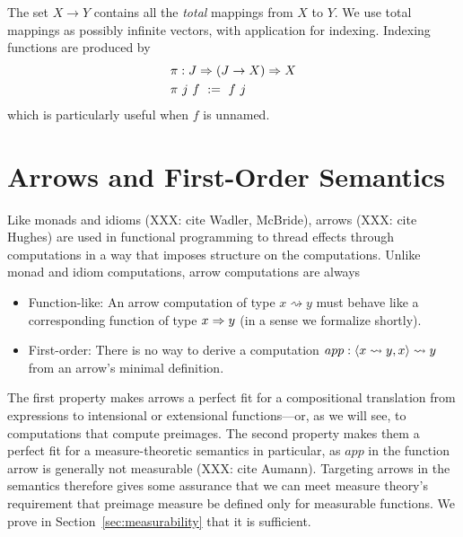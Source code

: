 \documentclass[preprint]{sigplanconf}
\newcommand{\arrow}{\rightsquigarrow}
\begin{document}
The set $X \to Y$ contains all the \emph{total} mappings from $X$ to $Y$.
We use total mappings as possibly infinite vectors, with application for indexing.
Indexing functions are produced by
\begin{equation}
\begin{aligned}
	&\pi : J \Rightarrow (J \to X) \Rightarrow X \\
	&\pi~j~f \ := \ f~j
\end{aligned}
\end{equation}
which is particularly useful when $f$ is unnamed.


\section{Arrows and First-Order Semantics}

Like monads and idioms (XXX: cite Wadler, McBride), arrows (XXX: cite Hughes) are used in functional programming to thread effects through computations in a way that imposes structure on the computations.
Unlike monad and idiom computations, arrow computations are always
\begin{itemize}
	\item Function-like: An arrow computation of type $x \arrow y$ must behave like a corresponding function of type $x \Rightarrow y$ (in a sense we formalize shortly).
	\item First-order: There is no way to derive a computation $app : \pair{x \arrow y, x} \arrow y$ from an arrow's minimal definition.
\end{itemize}
The first property makes arrows a perfect fit for a compositional translation from expressions to intensional or extensional functions---or, as we will see, to computations that compute preimages.
The second property makes them a perfect fit for a measure-theoretic semantics in particular, as $app$ in the function arrow is generally not measurable (XXX: cite Aumann).
Targeting arrows in the semantics therefore gives some assurance that we can meet measure theory's requirement that preimage measure be defined only for measurable functions.
We prove in Section~\ref{sec:measurability} that it is sufficient.
\end{document}
